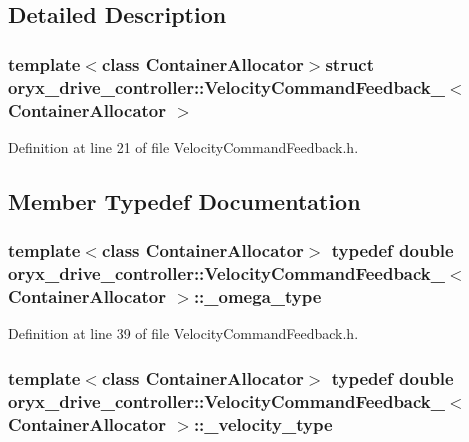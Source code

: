 \subsection{\-Detailed \-Description}
\subsubsection*{template$<$class \-Container\-Allocator$>$struct oryx\-\_\-drive\-\_\-controller\-::\-Velocity\-Command\-Feedback\-\_\-$<$ Container\-Allocator $>$}



\-Definition at line 21 of file \-Velocity\-Command\-Feedback.\-h.



\subsection{\-Member \-Typedef \-Documentation}
\subsubsection[{\-\_\-omega\-\_\-type}]{\setlength{\rightskip}{0pt plus 5cm}template$<$class \-Container\-Allocator$>$ typedef double {\bf oryx\-\_\-drive\-\_\-controller\-::\-Velocity\-Command\-Feedback\-\_\-}$<$ \-Container\-Allocator $>$\-::{\bf \-\_\-omega\-\_\-type}}\label{structoryx__drive__controller_1_1VelocityCommandFeedback___a15e4303ef9f4893bc495a4699ea82c1a}


\-Definition at line 39 of file \-Velocity\-Command\-Feedback.\-h.

\subsubsection[{\-\_\-velocity\-\_\-type}]{\setlength{\rightskip}{0pt plus 5cm}template$<$class \-Container\-Allocator$>$ typedef double {\bf oryx\-\_\-drive\-\_\-controller\-::\-Velocity\-Command\-Feedback\-\_\-}$<$ \-Container\-Allocator $>$\-::{\bf \-\_\-velocity\-\_\-type}}\label{structoryx__drive__controller_1_1VelocityCommandFeedback___ad6fb702ccfc6b6f0bc03e62dcf0c342b}


